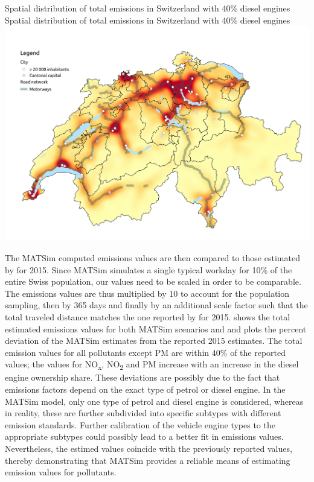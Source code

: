 \createfigure%
{Spatial distribution of total emissions in Switzerland with 40\% diesel engines}%
{Spatial distribution of total emissions in Switzerland with 40\% diesel engines}%
{\label{fig:spatialEmissions}}%
{\includegraphics[width=1.0\textwidth, angle=0]{figures/total_emissions_heatmap.pdf}}%
{}

The MATSim computed emissions values are then compared to those estimated by \citet{foen2010pollutants} for 2015.
Since MATSim simulates a single typical workday for 10\% of the entire Swiss population, our values need to be scaled in order to be comparable.
The emissions values are thus multiplied by 10 to account for the population sampling, then by 365 days and finally by an additional scale factor such that the total traveled distance matches the one reported by \citet{foen2010pollutants} for 2015.
 shows the total estimated emissions values for both MATSim scenarios and \citet{foen2010pollutants} and  plots the percent deviation of the MATSim estimates from the reported 2015 estimates.
The total emission values for all pollutants except PM are within 40\% of the reported values; the values for NO\textsubscript{x}, NO\textsubscript{2} and PM increase with an increase in the diesel engine ownership share.
These deviations are possibly due to the fact that emissions factors depend on the exact type of petrol or diesel engine.
In the MATSim model, only one type of petrol and diesel engine is considered, whereas in reality, these are further subdivided into specific subtypes with different emission standards.
Further calibration of the vehicle engine types to the appropriate subtypes could possibly lead to a better fit in emissions values.
Nevertheless, the estimed values coincide with the previously reported values, thereby demonstrating that MATSim provides a reliable means of estimating emission values for pollutants.


